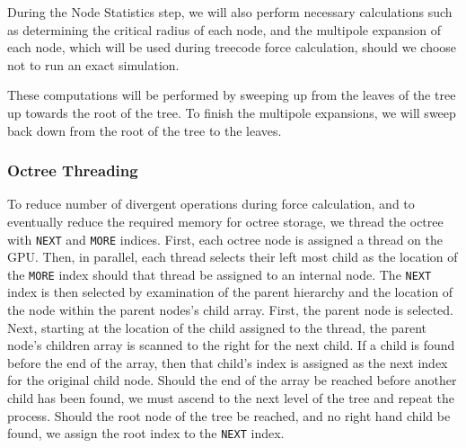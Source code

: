 \documentclass{thesis}
\begin{document}
During the Node Statistics step, we will also perform necessary calculations such as determining the critical radius of each node, and the multipole expansion of each node, which will be used during treecode force calculation, should we choose not to run an exact simulation.

These computations will be performed by sweeping up from the leaves of the tree up towards the root of the tree. To finish the multipole expansions, we will sweep back down from the root of the tree to the leaves.

\subsubsection{Octree Threading}
To reduce number of divergent operations during force calculation, and to eventually reduce the required memory for octree storage, we thread the octree with \texttt{NEXT} and \texttt{MORE} indices. First, each octree node is assigned a thread on the GPU. Then, in parallel, each thread selects their left most child as the location of the \texttt{MORE} index should that thread be assigned to an internal node. The \texttt{NEXT} index is then selected by examination of the parent hierarchy and the location of the node within the parent nodes's child array. First, the parent node is selected. Next, starting at the location of the child assigned to the thread, the parent node's children array is scanned to the right for the next child. If a child is found before the end of the array, then that child's index is assigned as the next index for the original child node. Should the end of the array be reached before another child has been found, we must ascend to the next level of the tree and repeat the process. Should the root node of the tree be reached, and no right hand child be found, we assign the root index to the \texttt{NEXT} index.
\end{document}

